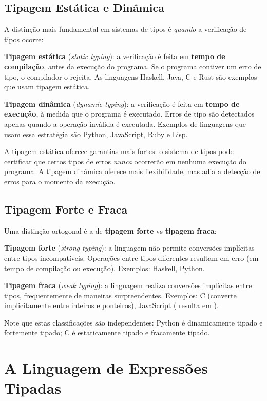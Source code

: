 \subsection{Tipagem Estática e Dinâmica}

A distinção mais fundamental em sistemas de tipos é \emph{quando} a
verificação de tipos ocorre:

\textbf{Tipagem estática} (\emph{static typing}): a verificação é
feita em \textbf{tempo de compilação}, antes da execução do programa.
Se o programa contiver um erro de tipo, o compilador o rejeita. As
linguagens Haskell, Java, C e Rust são exemplos que usam tipagem estática.

\textbf{Tipagem dinâmica} (\emph{dynamic typing}): a verificação é
feita em \textbf{tempo de execução}, à medida que o programa é
executado. Erros de tipo são detectados apenas quando a operação
inválida é executada. Exemplos de linguagens que usam essa estratégia
são Python, JavaScript, Ruby e Lisp.

A tipagem estática oferece garantias mais fortes: o sistema de tipos
pode certificar que certos tipos de erros \emph{nunca} ocorrerão em
nenhuma execução do programa. A tipagem dinâmica oferece mais
flexibilidade, mas adia a detecção de erros para o momento da execução.

\subsection{Tipagem Forte e Fraca}

Uma distinção ortogonal é a de \textbf{tipagem forte} vs \textbf{tipagem fraca}:

\textbf{Tipagem forte} (\emph{strong typing}): a linguagem não
permite conversões implícitas entre tipos incompatíveis. Operações
entre tipos diferentes resultam em erro (em tempo de compilação ou
execução). Exemplos: Haskell, Python.

\textbf{Tipagem fraca} (\emph{weak typing}): a linguagem realiza
conversões implícitas entre tipos, frequentemente de maneiras
surpreendentes. Exemplos: C (converte implicitamente entre inteiros e
ponteiros), JavaScript ( resulta em
).

Note que estas classificações são independentes: Python é
dinamicamente tipado e fortemente tipado; C é estaticamente tipado e
fracamente tipado.

\section{A Linguagem de Expressões Tipadas}

